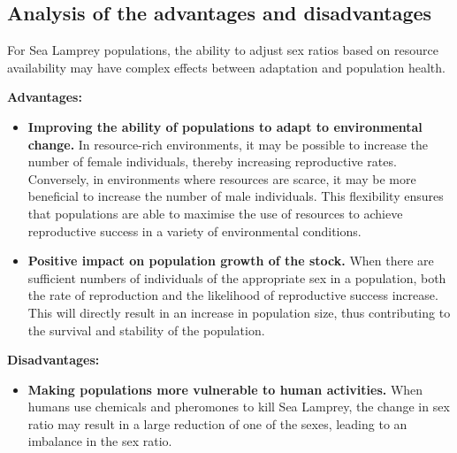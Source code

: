 \documentclass{mcmthesis}
\begin{document}
\subsection{Analysis of the advantages and disadvantages}
For Sea Lamprey populations, the ability to adjust sex ratios based on resource availability may have complex effects between adaptation and population health.

\textbf{Advantages:}
\begin{itemize}
  \item \textbf{Improving the ability of populations to adapt to environmental change.}
        In resource-rich environments, it may be possible to increase the number of female individuals, thereby increasing reproductive rates.
        Conversely, in environments where resources are scarce, it may be more beneficial to increase the number of male individuals.
        This flexibility ensures that populations are able to maximise the use of resources to achieve reproductive success in a variety of environmental conditions.
  \item \textbf{Positive impact on population growth of the stock.}
        When there are sufficient numbers of individuals of the appropriate sex in a population, both the rate of reproduction and the likelihood of reproductive success increase.
        This will directly result in an increase in population size, thus contributing to the survival and stability of the population.
\end{itemize}

\textbf{Disadvantages:}
\begin{itemize}
  \item \textbf{Making populations more vulnerable to human activities.}
        When humans use chemicals and pheromones to kill Sea Lamprey,
        the change in sex ratio may result in a large reduction of one of the sexes, leading to an imbalance in the sex ratio.
\end{itemize}


\end{document}
